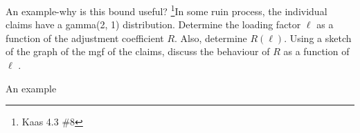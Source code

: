 \documentclass[11pt]{beamer}
\begin{document}
\begin{frame}{An example-why is this bound useful?}
\vspace{- 3cm}
\footnote{Kaas 4.3 \#8}In some ruin process, the individual claims have a gamma(2, 1) distribution. Determine the
loading factor $\ell$ as a function of the adjustment coefficient $R$. Also, determine $R( \ell )$. Using a sketch of the graph of the mgf of
the claims, discuss the behaviour of $R$ as a function of $\ell$ .

\end{frame}
\begin{frame}{An example}

\end{frame}
\end{document}
